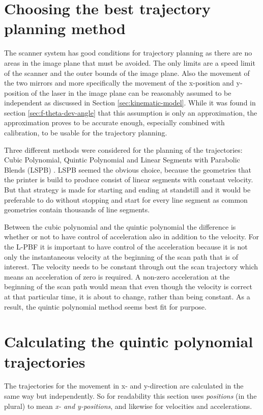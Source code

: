 \section{Choosing the best trajectory planning method}

The scanner system has good conditions for trajectory planning as there are no areas in the image plane that must be avoided. The only limits are a speed limit of the scanner and the outer bounds of the image plane. Also the movement of the two mirrors and more specifically the movement of the x-position and y-position of the laser in the image plane can be reasonably assumed to be independent as discussed in Section \ref{sec:kinematic-model}. While it was found in section \ref{sec:f-theta-dev-angle} that this assumption is only an approximation, the approximation proves to be accurate enough, especially combined with calibration, to be usable for the trajectory planning.

Three different methods were considered for the planning of the trajectories: Cubic Polynomial, Quintic Polynomial and Linear Segments with Parabolic Blends (LSPB) \cite[chapter 5.5.1]{robot-control}. LSPB seemed the obvious choice, because the geometries that the printer is build to produce consist of linear segments with constant velocity. But that strategy is made for starting and ending at standstill and it would be preferable to do without stopping and start for every line segment as common geometries contain thousands of line segments.

Between the cubic polynomial and the quintic polynomial the difference is whether or not to have control of acceleration also in addition to the velocity. For the L-PBF it is important to have control of the acceleration because it is not only the instantaneous velocity at the beginning of the scan path that is of interest. The velocity needs to be constant through out the scan trajectory which means an acceleration of zero is required. A non-zero acceleration at the beginning of the scan path would mean that even though the velocity is correct at that particular time, it is about to change, rather than being constant. As a result, the quintic polynomial method seems best fit for purpose.

\section{Calculating the quintic polynomial trajectories} \label{sec:calc-quintic-poly}

The trajectories for the movement in x- and y-direction are calculated in the same way but independently. So for readability this section uses \textit{positions} (in the plural) to mean \textit{x- and y-positions}, and likewise for velocities and accelerations.

